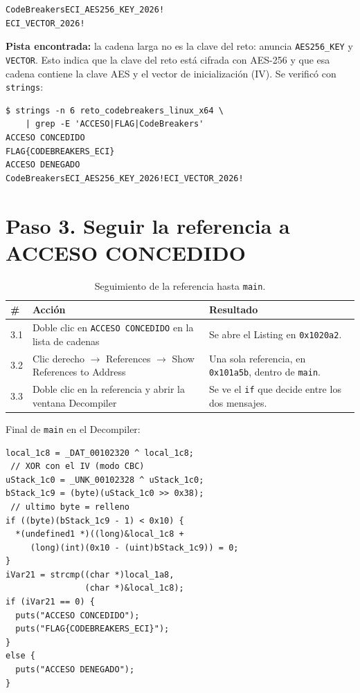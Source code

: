 \documentclass[journal]{IEEEtran}
\begin{document}
{\scriptsize\begin{verbatim}
CodeBreakersECI_AES256_KEY_2026!
ECI_VECTOR_2026!
\end{verbatim}}

\noindent\textbf{Pista encontrada:} la cadena larga no es la clave del reto:
anuncia \texttt{AES256\_\allowbreak{}KEY} y \texttt{VECTOR}. Esto indica que la clave del reto
est\'a cifrada con AES-256 y que esa cadena contiene la clave AES y el vector de
inicializaci\'on (IV). Se verific\'o con \texttt{strings}:

{\scriptsize\begin{verbatim}
$ strings -n 6 reto_codebreakers_linux_x64 \
    | grep -E 'ACCESO|FLAG|CodeBreakers'
ACCESO CONCEDIDO
FLAG{CODEBREAKERS_ECI}
ACCESO DENEGADO
CodeBreakersECI_AES256_KEY_2026!ECI_VECTOR_2026!
\end{verbatim}}

\section{Paso 3. Seguir la referencia a ACCESO CONCEDIDO}

\begin{table}[H]
\centering
\caption{Seguimiento de la referencia hasta \texttt{main}.}
\footnotesize
\begin{tabular}{@{}l p{1.35in} p{1.45in}@{}}
\hline
\# & Acci\'on & Resultado \\ \hline
3.1 & Doble clic en \texttt{ACCESO CONCEDIDO} en la lista de cadenas & Se abre el Listing en \texttt{0x1020a2}. \\
3.2 & Clic derecho $\rightarrow$ References $\rightarrow$ Show References to Address & Una sola referencia, en \texttt{0x101a5b}, dentro de \texttt{main}. \\
3.3 & Doble clic en la referencia y abrir la ventana Decompiler & Se ve el \texttt{if} que decide entre los dos mensajes. \\ \hline
\end{tabular}
\end{table}

Final de \texttt{main} en el Decompiler:

{\scriptsize\begin{verbatim}
local_1c8 = _DAT_00102320 ^ local_1c8;
 // XOR con el IV (modo CBC)
uStack_1c0 = _UNK_00102328 ^ uStack_1c0;
bStack_1c9 = (byte)(uStack_1c0 >> 0x38);
 // ultimo byte = relleno
if ((byte)(bStack_1c9 - 1) < 0x10) {
  *(undefined1 *)((long)&local_1c8 +
     (long)(int)(0x10 - (uint)bStack_1c9)) = 0;
}
iVar21 = strcmp((char *)local_1a8,
                (char *)&local_1c8);
if (iVar21 == 0) {
  puts("ACCESO CONCEDIDO");
  puts("FLAG{CODEBREAKERS_ECI}");
}
else {
  puts("ACCESO DENEGADO");
}
\end{verbatim}}
\end{document}
